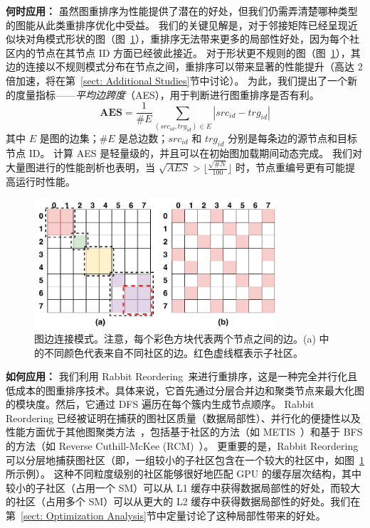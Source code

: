 \textbf{何时应用：} 虽然图重排序为性能提供了潜在的好处，但我们仍需弄清楚哪种类型的图能从此类重排序优化中受益。
我们的关键见解是，对于邻接矩阵已经呈现近似块对角模式形状的图（图~\ref{fig: node-renumbering}），重排序无法带来更多的局部性好处，因为每个社区内的节点在其节点 ID 方面已经彼此接近。
对于形状更不规则的图（图~\ref{fig: node-renumbering}），其边的连接以不规则模式分布在节点之间，重排序可以带来显著的性能提升（高达 2 倍加速，将在第~\ref{sect: Additional Studies}节中讨论）。
为此，我们提出了一个新的度量指标——\textit{平均边跨度}（AES），用于判断进行图重排序是否有利。
\begin{equation}  \label{equ: graph diameter}
    \mathbf{AES} = \frac{1}{\# E} \sum\limits_{(src_{id}, trg_{id}) \in E} |src_{id} - trg_{id}|
\end{equation}
其中 $E$ 是图的边集；$\#E$ 是总边数；$src_{id}$ 和 $trg_{id}$ 分别是每条边的源节点和目标节点 ID。
计算 AES 是轻量级的，并且可以在初始图加载期间动态完成。
我们对大量图进行的性能剖析也表明，当 $\sqrt{AES} > \lfloor\frac{\sqrt{\#N}}{100}\rfloor$ 时，节点重编号更有可能提高运行时性能。
\begin{figure}[htbp] %
    \centering
    \includegraphics[width=0.8\textwidth]{images/node-renumbering.pdf} %
    \caption{图边连接模式。注意，每个彩色方块代表两个节点之间的边。(a) 中的不同颜色代表来自不同社区的边。红色虚线框表示子社区。}
    \label{fig: node-renumbering} %
    \setlength{\abovecaptionskip}{0.4cm} %
    \setlength{\belowcaptionskip}{-0.4cm} %
\end{figure}

\textbf{如何应用：}
我们利用 Rabbit Reordering~\cite{rabbit-order}来进行重排序，这是一种完全并行化且低成本的图重排序技术。具体来说，它首先通过分层合并边和聚类节点来最大化图的模块度。然后，它通过 DFS 遍历在每个簇内生成节点顺序。
Rabbit Reordering 已经被证明在捕获的图社区质量（数据局部性）、并行化的便捷性以及性能方面优于其他图聚类方法~\cite{metis, boldi2011layered, raghavan2007near, karantasis2014parallelization, RCM-Algorithm}，包括基于社区的方法（如 METIS~\cite{metis}）和基于 BFS 的方法（如 Reverse Cuthill-McKee (RCM)~\cite{RCM-Algorithm}）。
更重要的是，Rabbit Reordering 可以分层地捕获图社区（即，一组较小的子社区包含在一个较大的社区中，如图~\ref{fig: node-renumbering}所示例）。
这种不同粒度级别的社区能够很好地匹配 GPU 的缓存层次结构，其中较小的子社区（占用一个 SM）可以从 L1 缓存中获得数据局部性的好处，而较大的社区（占用多个 SM）可以从更大的 L2 缓存中获得数据局部性的好处。我们在第~\ref{sect: Optimization Analysis}节中定量讨论了这种局部性带来的好处。

